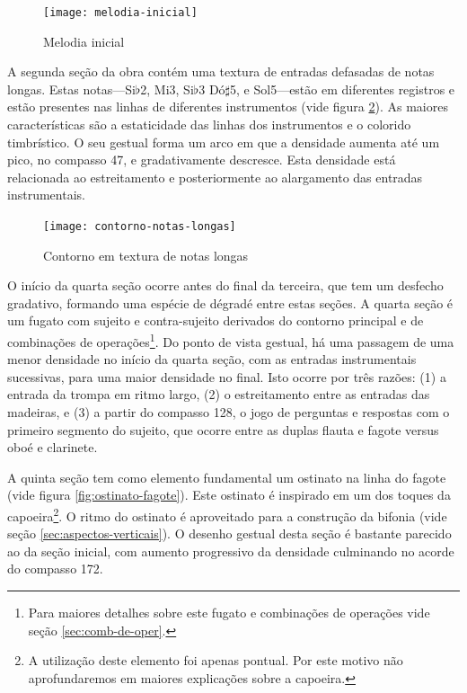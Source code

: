 \begin{figure}
  \centering
  \texttt{[image: melodia-inicial]}
  \caption{Melodia inicial}
  \label{fig:melodia-inicial}
\end{figure}

A segunda seção da obra contém uma textura de entradas defasadas de
notas longas. Estas notas---Si$\flat$2, Mi3, Si$\flat$3 Dó$\sharp$5, e
Sol5---estão em diferentes registros e estão presentes nas linhas de
diferentes instrumentos (vide figura
\ref{fig:contorno-notas-longas}). As maiores características são a
estaticidade das linhas dos instrumentos e o colorido timbrístico. O
seu gestual forma um arco em que a densidade aumenta até um pico, no
compasso 47, e gradativamente descresce. Esta densidade está
relacionada ao estreitamento e posteriormente ao alargamento das
entradas instrumentais.

\begin{figure}
  \centering
  \texttt{[image: contorno-notas-longas]}
  \caption{Contorno em textura de notas longas}
  \label{fig:contorno-notas-longas}
\end{figure}

O início da quarta seção ocorre antes do final da terceira, que tem um
desfecho gradativo, formando uma espécie de dégradé entre estas
seções. A quarta seção é um fugato com sujeito e contra-sujeito
derivados do contorno principal e de combinações de
operações\footnote{Para maiores detalhes sobre este fugato e
  combinações de operações vide seção \ref{sec:comb-de-oper}.}. Do
ponto de vista gestual, há uma passagem de uma menor densidade no
início da quarta seção, com as entradas instrumentais sucessivas, para
uma maior densidade no final. Isto ocorre por três razões: (1) a
entrada da trompa em ritmo largo, (2) o estreitamento entre as
entradas das madeiras, e (3) a partir do compasso 128, o jogo de
perguntas e respostas com o primeiro segmento do sujeito, que ocorre
entre as duplas flauta e fagote versus oboé e clarinete.

A quinta seção tem como elemento fundamental um ostinato na linha do
fagote (vide figura \ref{fig:ostinato-fagote}). Este ostinato é
inspirado em um dos toques da capoeira\footnote{A utilização deste
  elemento foi apenas pontual. Por este motivo não aprofundaremos em
  maiores explicações sobre a capoeira.}. O ritmo do ostinato é
aproveitado para a construção da bifonia (vide seção
\ref{sec:aspectos-verticais}). O desenho gestual desta seção é
bastante parecido ao da seção inicial, com aumento progressivo da
densidade culminando no acorde do compasso 172.

